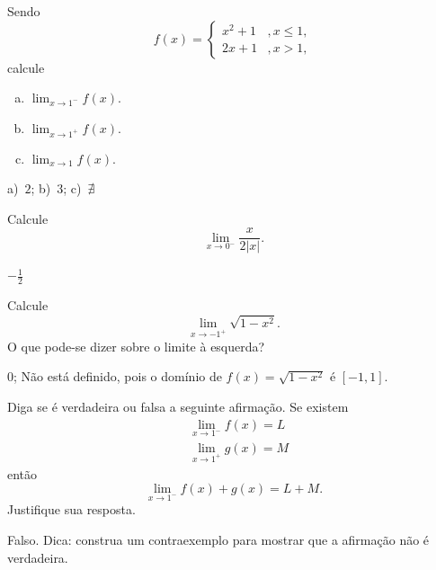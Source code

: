\begin{exer}
  Sendo
  \begin{equation}
    f(x) = \left\{
      \begin{array}{ll}
        x^2+1 &, x\leq 1,\\
        2x+1 &, x>1,
      \end{array}
    \right.
  \end{equation}
  calcule
  \begin{enumerate}[a)]
  \item $\displaystyle \lim_{x\to 1^-} f(x)$.
  \item $\displaystyle \lim_{x\to 1^+} f(x)$.
  \item $\displaystyle \lim_{x\to 1} f(x)$.
  \end{enumerate}
\end{exer}
\begin{resp}
  a)~$2$; b)~$3$; c)~$\nexists$
\end{resp}

\begin{exer}
  Calcule
  \begin{equation}
    \lim_{x\to 0^-} \frac{x}{2|x|}.
  \end{equation}
\end{exer}
\begin{resp}
  $-\frac{1}{2}$
\end{resp}

\begin{exer}
  Calcule
  \begin{equation}
    \lim_{x\to -1^+} \sqrt{1-x^2}.
  \end{equation}
  O que pode-se dizer sobre o limite à esquerda?
\end{exer}
\begin{resp}
  $0$; Não está definido, pois o domínio de $f(x)=\sqrt{1-x^2}$ é $[-1, 1]$.
\end{resp}

\begin{exer}
  Diga se é verdadeira ou falsa a seguinte afirmação. Se existem
  \begin{align}
    & \lim_{x\to 1^-} f(x) = L\\
    & \lim_{x\to 1^+} g(x) = M
  \end{align}
  então
  \begin{equation}
    \lim_{x\to 1^-} f(x) + g(x) = L + M.
  \end{equation}
  Justifique sua resposta.
\end{exer}
\begin{resp}
  Falso. Dica: construa um contraexemplo para mostrar que a afirmação não é verdadeira. 
\end{resp}

